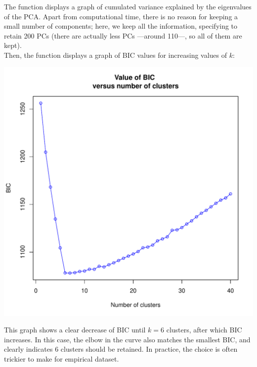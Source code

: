 \documentclass{article}
\begin{document}
\noindent
The function displays a graph of cumulated variance explained by the eigenvalues of the PCA.
Apart from computational time, there is no reason for keeping a small number of components; here, we
keep all the information, specifying to retain 200 PCs (there are actually less PCs ---around 110---, so all of them
are kept).
\\

Then, the function displays a graph of BIC values for increasing values of $k$:
\begin{center}
  \includegraphics[width=.7\textwidth]{figs/findclust-bic.pdf}
\end{center}

\noindent This graph shows a clear decrease of BIC until $k=6$ clusters, after which BIC increases.
In this case, the elbow in the curve also matches the smallest BIC, and clearly indicates 6 clusters
should be retained. In practice, the choice is often trickier to make for empirical dataset.
\\
\end{document}
